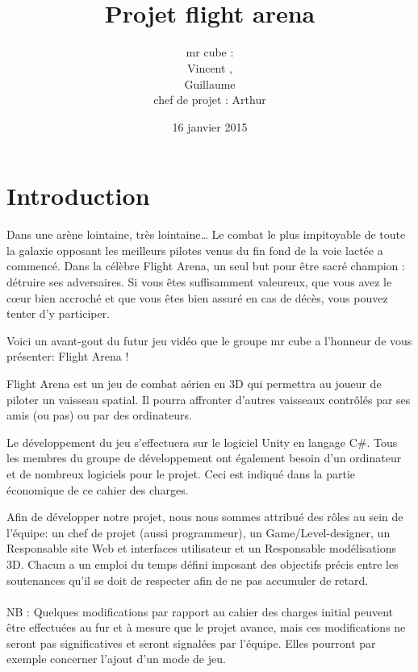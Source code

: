 \documentclass[10pt, titlepage]{report}
\title{\bsc{cahier des charges}\\Projet flight arena}
\author{mr cube :\\
Vincent \bsc{Rospini-Clerici},\\
Guillaume \bsc{Rebut}\\
chef de projet : Arthur \bsc{Remaud}}
\date{16 janvier 2015}
\begin{document}
\maketitle

\renewcommand{\contentsname}{Sommaire}
\renewcommand{\chaptername}{Partie}

\tableofcontents

\chapter{Introduction}

Dans une arène lointaine, très lointaine… Le combat le plus impitoyable de toute la galaxie opposant les meilleurs pilotes venus du fin fond de la voie lactée a commencé. Dans la célèbre Flight Arena, un seul but pour être sacré champion : détruire ses adversaires. Si vous êtes suffisamment valeureux, que vous avez le cœur bien accroché et que vous êtes bien assuré en cas de décès, vous pouvez tenter d’y participer.

Voici un avant-gout du futur jeu vidéo que le groupe mr cube a l’honneur de vous présenter: Flight Arena !

Flight Arena est un jeu de combat aérien en 3D qui permettra au joueur de piloter un vaisseau spatial. Il pourra affronter d’autres vaisseaux contrôlés par ses amis (ou pas) ou par des ordinateurs.

Le développement du jeu s’effectuera sur le logiciel Unity en langage C\#. Tous les membres du groupe de développement ont également besoin d’un ordinateur et de nombreux logiciels pour le projet. Ceci est indiqué dans la partie économique de ce cahier des charges.

Afin de développer notre projet, nous nous sommes attribué des rôles au sein de l’équipe: un chef de projet (aussi programmeur), un Game/Level-designer, un Responsable site Web et interfaces utilisateur et un Responsable modélisations 3D. Chacun a un emploi du temps défini imposant des objectifs précis entre les soutenances qu’il se doit de respecter afin de ne pas accumuler de retard.\\ \\

NB : Quelques modifications par rapport au cahier des charges initial peuvent être effectuées au fur et à mesure que le projet avance, mais ces modifications ne seront pas significatives et seront signalées par l’équipe. Elles pourront par exemple concerner l’ajout d’un mode de jeu.
\end{document}
